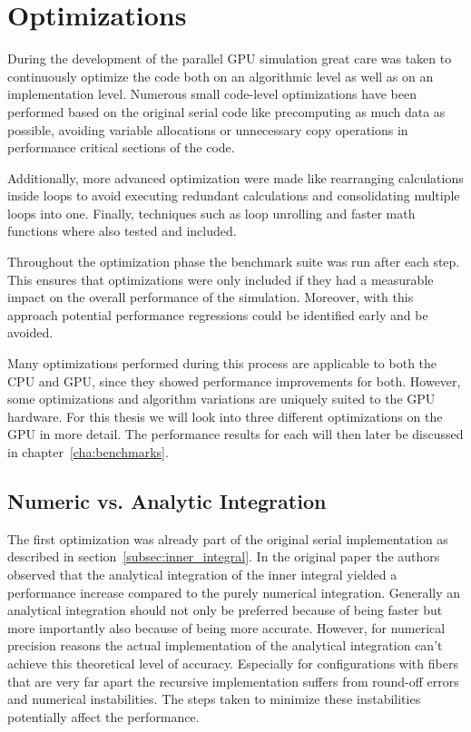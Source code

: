 \documentclass[a4paper,11pt]{kth-mag}
\begin{document}
\section{Optimizations}
\label{sec:parallel_optimizations}

During the development of the parallel GPU simulation great care was taken to continuously optimize the code both on an algorithmic level as well as on an implementation level. Numerous small code-level optimizations have been performed based on the original serial code like precomputing as much data as possible, avoiding variable allocations or unnecessary copy operations in performance critical sections of the code.

Additionally, more advanced optimization were made like rearranging calculations inside loops to avoid executing redundant calculations and consolidating multiple loops into one. Finally, techniques such as loop unrolling and faster math functions where also tested and included.

Throughout the optimization phase the benchmark suite was run after each step. This ensures that optimizations were only included if they had a measurable impact on the overall performance of the simulation. Moreover, with this approach potential performance regressions could be identified early and be avoided.

Many optimizations performed during this process are applicable to both the CPU and GPU, since they showed performance improvements for both. However, some optimizations and algorithm variations are uniquely suited to the GPU hardware. For this thesis we will look into three different optimizations on the GPU in more detail. The performance results for each will then later be discussed in chapter~\ref{cha:benchmarks}.

\subsection{Numeric vs. Analytic Integration}
\label{subsec:numeric_analytic}
The first optimization was already part of the original serial implementation as described in section~\ref{subsec:inner_integral}. In the original paper \cite{Tornberg2006} the authors observed that the analytical integration of the inner integral yielded a performance increase compared to the purely numerical integration. Generally an analytical integration should not only be preferred because of being faster but more importantly also because of being more accurate. However, for numerical precision reasons the actual implementation of the analytical integration can't achieve this theoretical level of accuracy. Especially for configurations with fibers that are very far apart the recursive implementation suffers from round-off errors and numerical instabilities. The steps taken to minimize these instabilities potentially affect the performance.
\end{document}

